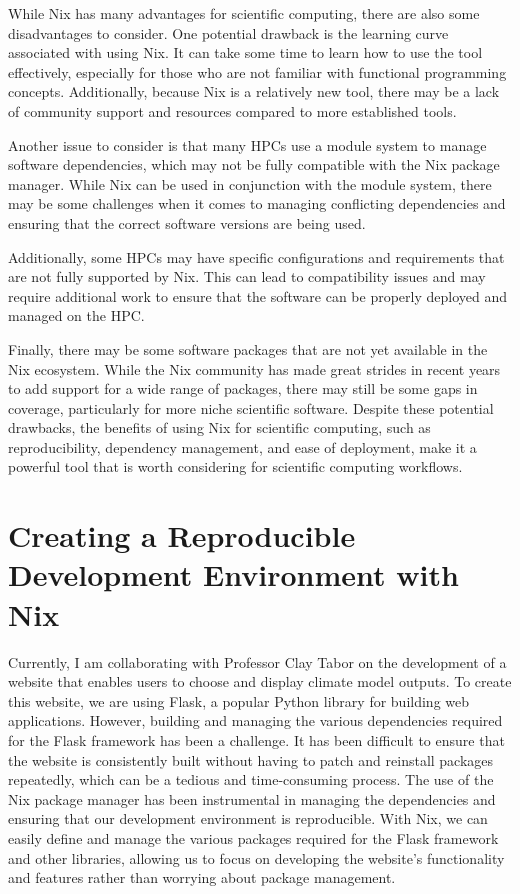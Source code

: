 \documentclass[
]{article}
\begin{document}
While Nix has many advantages for scientific computing, there are also some disadvantages to consider. One potential drawback is the learning curve associated with using Nix. It can take some time to learn how to use the tool effectively, especially for those who are not familiar with functional programming concepts. Additionally, because Nix is a relatively new tool, there may be a lack of community support and resources compared to more established tools.

Another issue to consider is that many HPCs use a module system to manage software dependencies, which may not be fully compatible with the Nix package manager. While Nix can be used in conjunction with the module system, there may be some challenges when it comes to managing conflicting dependencies and ensuring that the correct software versions are being used.

Additionally, some HPCs may have specific configurations and requirements that are not fully supported by Nix. This can lead to compatibility issues and may require additional work to ensure that the software can be properly deployed and managed on the HPC.

Finally, there may be some software packages that are not yet available in the Nix ecosystem. While the Nix community has made great strides in recent years to add support for a wide range of packages, there may still be some gaps in coverage, particularly for more niche scientific software. Despite these potential drawbacks, the benefits of using Nix for scientific computing, such as reproducibility, dependency management, and ease of deployment, make it a powerful tool that is worth considering for scientific computing workflows.

\hypertarget{creating-a-reproducible-development-environment-with-nix}{%
\section{Creating a Reproducible Development Environment with Nix}\label{creating-a-reproducible-development-environment-with-nix}}

Currently, I am collaborating with Professor Clay Tabor on the development of a website that enables users to choose and display climate model outputs. To create this website, we are using Flask, a popular Python library for building web applications. However, building and managing the various dependencies required for the Flask framework has been a challenge. It has been difficult to ensure that the website is consistently built without having to patch and reinstall packages repeatedly, which can be a tedious and time-consuming process. The use of the Nix package manager has been instrumental in managing the dependencies and ensuring that our development environment is reproducible. With Nix, we can easily define and manage the various packages required for the Flask framework and other libraries, allowing us to focus on developing the website's functionality and features rather than worrying about package management.
\end{document}
